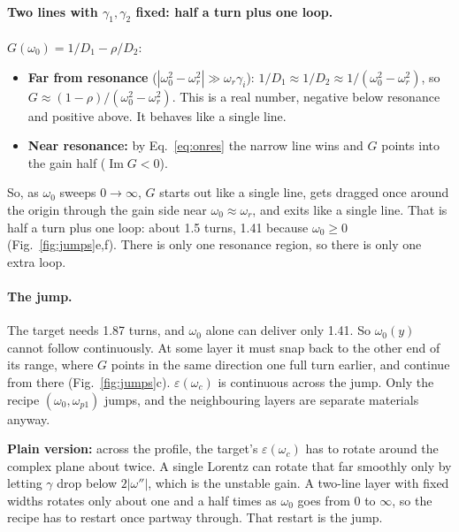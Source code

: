 \documentclass[11pt]{article}
\newcommand{\wi}{|\omega''|}          %
\newcommand{\wpa}{\omega_{p1}}
\renewcommand{\Im}{\operatorname{Im}}
\begin{document}
\paragraph{Two lines with $\gamma_1,\gamma_2$ fixed: half a turn plus one loop.} $G(\omega_0)=1/D_1-\rho/D_2$:
\begin{itemize}
  \item \textbf{Far from resonance} ($|\omega_0^2-\omega_r^2|\gg\omega_r\gamma_i$): $1/D_1\approx1/D_2\approx1/(\omega_0^2-\omega_r^2)$, so $G\approx(1-\rho)/(\omega_0^2-\omega_r^2)$.
  This is a real number, negative below resonance and positive above. It behaves like a single line.
  \item \textbf{Near resonance:} by Eq.~\eqref{eq:onres} the narrow line wins and $G$ points into the gain half ($\Im G<0$).
\end{itemize}
So, as $\omega_0$ sweeps $0\to\infty$, $G$ starts out like a single line, gets dragged once around the origin through the gain side near $\omega_0\approx\omega_r$, and exits like a single line.
That is half a turn plus one loop: about 1.5 turns, 1.41 because $\omega_0\ge0$ (Fig.~\ref{fig:jumps}e,f).
There is only one resonance region, so there is only one extra loop.

\paragraph{The jump.} The target needs 1.87 turns, and $\omega_0$ alone can deliver only 1.41.
So $\omega_0(y)$ cannot follow continuously. At some layer it must snap back to the other end of its range, where $G$ points in the same direction one full turn earlier, and continue from there (Fig.~\ref{fig:jumps}c).
$\varepsilon(\omega_c)$ is continuous across the jump. Only the recipe $(\omega_0,\wpa)$ jumps, and the neighbouring layers are separate materials anyway.

\begin{result}
\textbf{Plain version:} across the profile, the target's $\varepsilon(\omega_c)$ has to rotate around the complex plane about twice.
A single Lorentz can rotate that far smoothly only by letting $\gamma$ drop below $2\wi$, which is the unstable gain.
A two-line layer with fixed widths rotates only about one and a half times as $\omega_0$ goes from 0 to $\infty$, so the recipe has to restart once partway through.
That restart is the jump.
\end{result}
\end{document}
